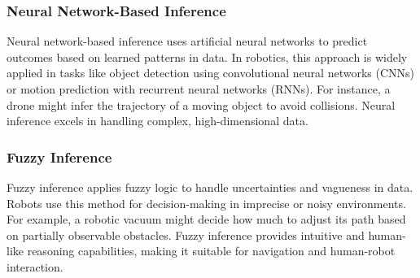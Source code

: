     \subsubsection{Neural Network-Based Inference}
    Neural network-based inference uses artificial neural networks to predict outcomes based on learned patterns in data. In robotics, this approach is widely applied in tasks like object detection using convolutional neural networks (CNNs) or motion prediction with recurrent neural networks (RNNs). For instance, a drone might infer the trajectory of a moving object to avoid collisions. Neural inference excels in handling complex, high-dimensional data. 

    \subsubsection{Fuzzy Inference}
    Fuzzy inference applies fuzzy logic to handle uncertainties and vagueness in data. Robots use this method for decision-making in imprecise or noisy environments. For example, a robotic vacuum might decide how much to adjust its path based on partially observable obstacles. Fuzzy inference provides intuitive and human-like reasoning capabilities, making it suitable for navigation and human-robot interaction. 